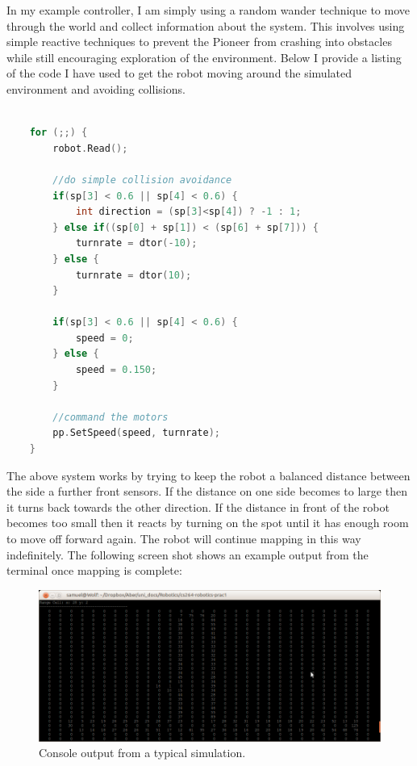 \documentclass{article}
\begin{document}
In my example controller, I am simply using a random wander technique to move through the world and collect information about the system. This involves using simple reactive techniques to prevent the Pioneer from crashing into obstacles while still encouraging exploration of the environment. Below I provide a listing of the code I have used to get the robot moving around the simulated environment and avoiding collisions.

\begin{center}
	\begin{lstlisting}[language=c++, showstringspaces=false, caption={C++ code used to make control the robot to reactively wander through the environment}]

	for (;;) {
		robot.Read();

		//do simple collision avoidance
		if(sp[3] < 0.6 || sp[4] < 0.6) {
			int direction = (sp[3]<sp[4]) ? -1 : 1;
		} else if((sp[0] + sp[1]) < (sp[6] + sp[7])) {
			turnrate = dtor(-10);
		} else {
			turnrate = dtor(10);
		}

		if(sp[3] < 0.6 || sp[4] < 0.6) {
			speed = 0;
		} else {
			speed = 0.150;
		}

		//command the motors
		pp.SetSpeed(speed, turnrate);
	}

	\end{lstlisting}
\end{center}

The above system works by trying to keep the robot a balanced distance between the side a further front sensors. If the distance on one side becomes to large then it turns back towards the other direction. If the distance in front of the robot becomes too small then it reacts by turning on the spot until it has enough room to move off forward again. The robot will continue mapping in this way indefinitely. The following screen shot shows an example output from the terminal once mapping is complete:

\begin{figure}[H]
\centering
\includegraphics[width=1\textwidth]{example_run.png}
\caption{Console output from a typical simulation.}
\label{fig:example-run}
\end{figure}
\end{document}
